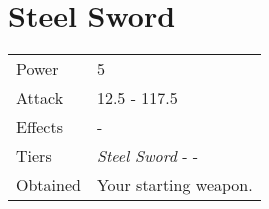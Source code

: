 \section{Steel Sword}
\label{weapon:steel_sword}


\noindent\begin{tabularx}{\textwidth}[l]{lX}
	Power
	& 5
\\
	Attack
	& 12.5 - 117.5
\\
	Effects
	& -
\\
	Tiers
	& \textit{Steel Sword} - \nameref{weapon:knights_sword} - \nameref{weapon:excalibur}
\\
	Obtained
	& Your starting weapon.
\end{tabularx}
